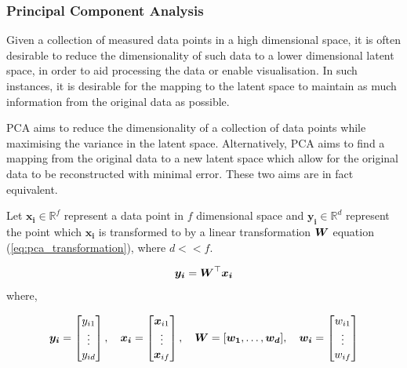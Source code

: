 \subsubsection{Principal Component Analysis} \label{sec:pca}
Given a collection of measured data points in a high dimensional space, it is often desirable to reduce the dimensionality of such data to a lower dimensional latent space, in order to aid processing the data or enable visualisation.
In such instances, it is desirable for the mapping to the latent space to maintain as much information from the original data as possible.

PCA aims to reduce the dimensionality of a collection of data points while maximising the variance in the latent space.
Alternatively, PCA aims to find a mapping from the original data to a new latent space which allow for the original data to be reconstructed with minimal error.
These two aims are in fact equivalent.

Let $\bm{x_i} \in \mathbb{R}^f$ represent a data point in $f$ dimensional space and $\bm{y_i} \in \mathbb{R}^d$ represent the point which $\bm{x_i}$ is transformed to by a linear transformation ${\boldsymbol{{W}}}$ equation (\ref{eq:pca_transformation}), where $d << f$.

\begin{equation} \label{eq:pca_transformation}
    {\boldsymbol{{y_i}}} = {\boldsymbol{{W}}}^\top {\boldsymbol{{x_i}}}
\end{equation}
where,

\begin{equation*}
    {\boldsymbol{{y_i}}} = \begin{bmatrix} 
                y_{i1} \\
                \vdots \\
                y_{id} 
               \end{bmatrix},
    \quad
    {\boldsymbol{{x_i}}} = \begin{bmatrix} 
                {\boldsymbol{{x}}}_{i1} \\
                \vdots \\
                {\boldsymbol{{x}}}_{if} 
               \end{bmatrix},
    \quad
    {\boldsymbol{{W}}} = [
               {\boldsymbol{{w_1}}}, \dots, {\boldsymbol{{w_d}}}
              ],
    \quad
    {\boldsymbol{{w_i}}} = \begin{bmatrix} 
                w_{i1} \\
                \vdots \\
                w_{if} 
               \end{bmatrix}
\end{equation*}

